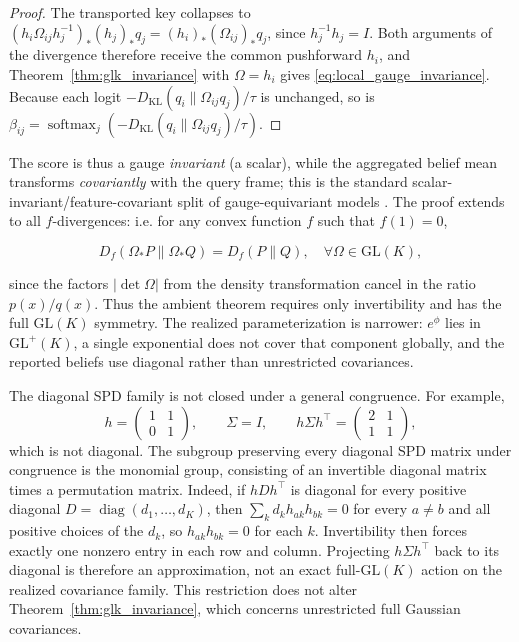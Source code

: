 \documentclass[twoside,11pt]{article}
\begin{document}
\begin{proof}
The transported key collapses to $(h_i \Omega_{ij} h_j^{-1})_* (h_j)_* q_j = (h_i)_* (\Omega_{ij})_* q_j$, since $h_j^{-1} h_j = I$. Both arguments of the divergence therefore receive the common pushforward $h_i$, and Theorem~\ref{thm:glk_invariance} with $\Omega = h_i$ gives \eqref{eq:local_gauge_invariance}. Because each logit $-D_{\mathrm{KL}}(q_i \| \Omega_{ij} q_j)/\tau$ is unchanged, so is $\beta_{ij} = \operatorname{softmax}_j(-D_{\mathrm{KL}}(q_i \| \Omega_{ij} q_j)/\tau)$.
\end{proof}

The score is thus a gauge \emph{invariant} (a scalar), while the aggregated belief mean transforms \emph{covariantly} with the query frame; this is the standard scalar-invariant/feature-covariant split of gauge-equivariant models \citep{cohen2019gauge}. The proof extends to all $f$-divergences: i.e. for any convex function $f$ such that $f(1) = 0$,

\begin{equation}
D_f(\Omega_* P \| \Omega_* Q) = D_f(P \| Q), \quad \forall \Omega \in \mathrm{GL}(K),
\end{equation}

since the factors $|\det\Omega|$ from the density transformation cancel in the ratio $p(x)/q(x)$. Thus the ambient theorem requires only invertibility and has the full $\mathrm{GL}(K)$ symmetry. The realized parameterization is narrower: $e^{\phi}$ lies in $\mathrm{GL}^+(K)$, a single exponential does not cover that component globally, and the reported beliefs use diagonal rather than unrestricted covariances.

The diagonal SPD family is not closed under a general congruence. For example,
\begin{equation}
h = \begin{pmatrix}1&1\\0&1\end{pmatrix},
\qquad
\Sigma=I,
\qquad
h\Sigma h^\top = \begin{pmatrix}2&1\\1&1\end{pmatrix},
\label{eq:diagonal_congruence_counterexample}
\end{equation}
which is not diagonal. The subgroup preserving every diagonal SPD matrix under congruence is the monomial group, consisting of an invertible diagonal matrix times a permutation matrix. Indeed, if $hDh^\top$ is diagonal for every positive diagonal $D=\operatorname{diag}(d_1,\ldots,d_K)$, then $\sum_k d_k h_{ak}h_{bk}=0$ for every $a\neq b$ and all positive choices of the $d_k$, so $h_{ak}h_{bk}=0$ for each $k$. Invertibility then forces exactly one nonzero entry in each row and column. Projecting $h\Sigma h^\top$ back to its diagonal is therefore an approximation, not an exact full-$\mathrm{GL}(K)$ action on the realized covariance family. This restriction does not alter Theorem~\ref{thm:glk_invariance}, which concerns unrestricted full Gaussian covariances.
\end{document}
